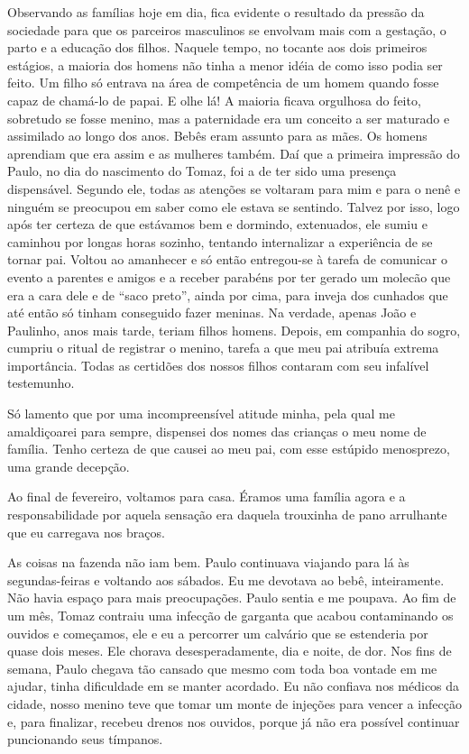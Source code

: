 Observando as famílias hoje em dia, fica evidente o resultado da pressão da sociedade para que os parceiros masculinos se envolvam mais com a gestação, o parto e a educação dos filhos.
Naquele tempo, no tocante aos dois primeiros estágios, a maioria dos homens não tinha a menor idéia de como isso podia ser feito.
Um filho só entrava na área de competência de um homem quando fosse capaz de chamá-lo de papai.
E olhe lá! A maioria ficava orgulhosa do feito, sobretudo se fosse menino, mas a paternidade era um conceito a ser maturado e assimilado ao longo dos anos.
Bebês eram assunto para as mães.
Os homens aprendiam que era assim e as mulheres também.
Daí que a primeira impressão do Paulo, no dia do nascimento do Tomaz, foi a de ter sido uma presença dispensável.
Segundo ele, todas as atenções se voltaram para mim e para o nenê e ninguém se preocupou em saber como ele estava se sentindo.
Talvez por isso, logo após ter certeza de que estávamos bem e dormindo, extenuados, ele sumiu e caminhou por longas horas sozinho, tentando internalizar a experiência de se tornar pai.
Voltou ao amanhecer e só então entregou-se à tarefa de comunicar o evento a parentes e amigos e a receber parabéns por ter gerado um molecão que era a cara dele e de ``saco preto'', ainda por cima, para inveja dos cunhados que até então só tinham conseguido fazer meninas.
Na verdade, apenas João e Paulinho, anos mais tarde, teriam filhos homens.
Depois, em companhia do sogro, cumpriu o ritual de registrar o menino, tarefa a que meu pai atribuía extrema importância.
Todas as certidões dos nossos filhos contaram com seu infalível testemunho.

Só lamento que por uma incompreensível atitude minha, pela qual me amaldiçoarei para sempre, dispensei dos nomes das crianças o meu nome de família.
Tenho certeza de que causei ao meu pai, com esse estúpido menosprezo, uma grande decepção.

Ao final de fevereiro, voltamos para casa.
Éramos uma família agora e a responsabilidade por aquela sensação era daquela trouxinha de pano arrulhante que eu carregava nos braços.

As coisas na fazenda não iam bem.
Paulo continuava viajando para lá às segundas-feiras e voltando aos sábados.
Eu me devotava ao bebê, inteiramente.
Não havia espaço para mais preocupações.
Paulo sentia e me poupava.
Ao fim de um mês, Tomaz contraiu uma infecção de garganta que acabou contaminando os ouvidos e começamos, ele e eu a percorrer um calvário que se estenderia por quase dois meses.
Ele chorava desesperadamente, dia e noite, de dor.
Nos fins de semana, Paulo chegava tão cansado que mesmo com toda boa vontade em me ajudar, tinha dificuldade em se manter acordado.
Eu não confiava nos médicos da cidade, nosso menino teve que tomar um monte de injeções para vencer a infecção e, para finalizar, recebeu drenos nos ouvidos, porque já não era possível continuar puncionando seus tímpanos.

